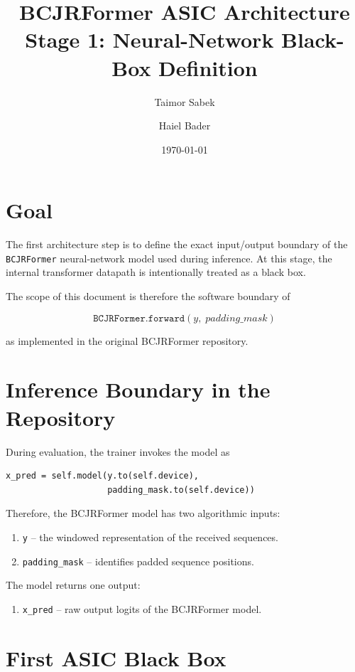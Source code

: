 \documentclass[11pt,a4paper]{article}
\title{\textbf{BCJRFormer ASIC Architecture}\\
\large Stage 1: Neural-Network Black-Box Definition}
\author{Taimor Sabek \and Haiel Bader}
\date{\today}
\begin{document}
\maketitle

\section{Goal}

The first architecture step is to define the exact input/output boundary of the
\texttt{BCJRFormer} neural-network model used during inference. At this stage,
the internal transformer datapath is intentionally treated as a black box.

The scope of this document is therefore the software boundary of

\[
\texttt{BCJRFormer.forward}(y,\;padding\_mask)
\]

as implemented in the original BCJRFormer repository.

\section{Inference Boundary in the Repository}

During evaluation, the trainer invokes the model as

\begin{verbatim}
x_pred = self.model(y.to(self.device),
                    padding_mask.to(self.device))
\end{verbatim}

Therefore, the BCJRFormer model has two algorithmic inputs:

\begin{enumerate}[label=\arabic*.]
    \item \texttt{y} -- the windowed representation of the received sequences.
    \item \texttt{padding\_mask} -- identifies padded sequence positions.
\end{enumerate}

The model returns one output:

\begin{enumerate}[label=\arabic*.]
    \item \texttt{x\_pred} -- raw output logits of the BCJRFormer model.
\end{enumerate}

\section{First ASIC Black Box}
\end{document}
